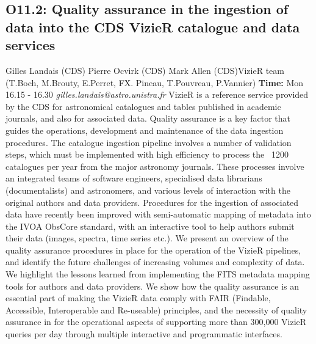 \documentclass{report}
\begin{document}
\subsection*{O11.2: Quality assurance in the ingestion of data into the CDS VizieR catalogue and data services}
\bigskip
Gilles Landais (CDS) \newline Pierre Ocvirk (CDS) \newline  Mark Allen (CDS)\newline   \newline  \newline  VizieR team (T.Boch, M.Brouty, E.Perret, FX. Pineau, T.Pouvreau, P.Vannier)\newline\newline
{\bf Time:} Mon 16.15 - 16.30\newline
\newline
{\it gilles.landais@astro.unistra.fr}\newline
\newline\newline
VizieR is a reference service provided by the CDS for astronomical catalogues and tables published in academic journals, and also for associated data. Quality assurance is a key factor that guides the operations, development and maintenance of the data ingestion procedures. 
The catalogue ingestion pipeline involves a number of validation steps, which must be implemented with high efficiency to process the ~1200 catalogues per year from the major astronomy journals. These processes involve an integrated teams of software engineers, specialised data librarians (documentalists) and astronomers, and various levels of interaction with the original authors and data providers. Procedures for the ingestion of associated data have recently been improved with semi-automatic mapping of metadata into the IVOA ObsCore standard, with an interactive tool to help authors submit their data (images, spectra, time series etc.). 
We present an overview of the quality assurance procedures in place for the operation of the VizieR pipelines, and identify the future challenges of increasing volumes and complexity of data. We highlight the lessons learned from implementing the FITS metadata mapping tools for authors and data providers. We show how the quality assurance is an essential part of making the VizieR data comply with FAIR (Findable, Accessible, Interoperable and Re-useable) principles, and the necessity of quality assurance in for the operational aspects of supporting more than 300,000 VizieR queries per day through multiple interactive and programmatic interfaces.\newline
\newpage
\end{document}
